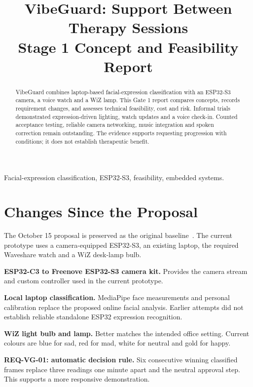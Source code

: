 \documentclass[conference,letterpaper]{IEEEtran}
\title{VibeGuard: Support Between Therapy Sessions\\Stage 1 Concept and Feasibility Report}
\author{\IEEEauthorblockN{Pina Cammisano}\IEEEauthorblockA{Project I (247-519-VA)\\Vanier College\\November 20, 2026}}
\begin{document}
\maketitle
\begin{abstract}
VibeGuard combines laptop-based facial-expression classification with an ESP32-S3 camera, a voice watch and a WiZ lamp. This Gate 1 report compares concepts, records requirement changes, and assesses technical feasibility, cost and risk. Informal trials demonstrated expression-driven lighting, watch updates and a voice check-in. Counted acceptance testing, reliable camera networking, music integration and spoken correction remain outstanding. The evidence supports requesting progression with conditions; it does not establish therapeutic benefit.
\end{abstract}
\begin{IEEEkeywords}
Facial-expression classification, ESP32-S3, feasibility, embedded systems.
\end{IEEEkeywords}
\section{Changes Since the Proposal}

The October 15 proposal is preserved as the original baseline~\cite{course}.
The current prototype uses a camera-equipped ESP32-S3, an existing
laptop, the required Waveshare watch and a WiZ desk-lamp bulb.

\noindent\textbf{ESP32-C3 to Freenove ESP32-S3 camera kit.} Provides the camera stream and custom controller used in the current prototype.\par

\noindent\textbf{Local laptop classification.} MediaPipe face measurements and personal calibration replace the proposed online facial analysis. Earlier attempts did not establish reliable standalone ESP32 expression recognition.\par

\noindent\textbf{WiZ light bulb and lamp.} Better matches the intended office setting. Current colours are blue for sad, red for mad, white for neutral and gold for happy.\par

\noindent\textbf{REQ-VG-01: automatic decision rule.} Six consecutive winning classified frames replace three readings one minute apart and the neutral approval step. This supports a more responsive demonstration.\par
\end{document}
